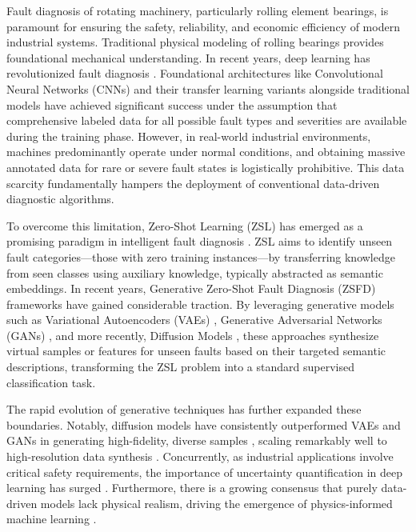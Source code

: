 \documentclass[journal]{IEEEtran}
\begin{document}
Fault diagnosis of rotating machinery, particularly rolling element bearings, is paramount for ensuring the safety, reliability, and economic efficiency of modern industrial systems. Traditional physical modeling of rolling bearings \cite{harris2001rolling,mcfadden1984model} provides foundational mechanical understanding. In recent years, deep learning has revolutionized fault diagnosis \cite{liu2018artificial}. Foundational architectures like Convolutional Neural Networks (CNNs) \cite{jia2016deep,wen2018new,zhang2018deep} and their transfer learning variants \cite{li2020deep} alongside traditional models \cite{zhao2019deep,lei2020applications} have achieved significant success under the assumption that comprehensive labeled data for all possible fault types and severities are available during the training phase. However, in real-world industrial environments, machines predominantly operate under normal conditions, and obtaining massive annotated data for rare or severe fault states is logistically prohibitive. This data scarcity fundamentally hampers the deployment of conventional data-driven diagnostic algorithms. 

To overcome this limitation, Zero-Shot Learning (ZSL) has emerged as a promising paradigm in intelligent fault diagnosis \cite{xian2018zero,pan2009survey}. ZSL aims to identify unseen fault categories—those with zero training instances—by transferring knowledge from seen classes using auxiliary knowledge, typically abstracted as semantic embeddings. In recent years, Generative Zero-Shot Fault Diagnosis (ZSFD) frameworks have gained considerable traction. By leveraging generative models such as Variational Autoencoders (VAEs) \cite{kingma2013auto}, Generative Adversarial Networks (GANs) \cite{goodfellow2014generative}, and more recently, Diffusion Models \cite{ho2020denoising}, these approaches synthesize virtual samples or features for unseen faults based on their targeted semantic descriptions, transforming the ZSL problem into a standard supervised classification task.

The rapid evolution of generative techniques has further expanded these boundaries. Notably, diffusion models have consistently outperformed VAEs and GANs in generating high-fidelity, diverse samples \cite{dhariwal2021diffusion,nichol2021improved}, scaling remarkably well to high-resolution data synthesis \cite{rombach2022high}. Concurrently, as industrial applications involve critical safety requirements, the importance of uncertainty quantification in deep learning has surged \cite{kendall2017uncertainties,abdar2021review}. Furthermore, there is a growing consensus that purely data-driven models lack physical realism, driving the emergence of physics-informed machine learning \cite{karniadakis2021physics}. 
\end{document}
